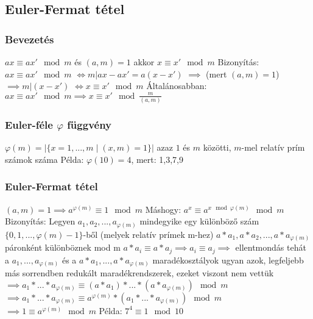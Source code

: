 \documentclass[12pt,a4paper]{article}
\begin{document}
\pagebreak

\subsection{Euler-Fermat tétel}

\subsubsection{Bevezetés}

\begin{outline}
	\1 $ax \equiv ax' \mod m$ és $(a,m)=1$ akkor $x \equiv x' \mod m$
		\2 Bizonyítás: $ax \equiv ax' \mod m$
		\2 $\Leftrightarrow m | ax-ax'=a(x-x')$
		\2 $\implies$ (mert $(a,m)=1$) $\implies m|(x-x')$
		\2 $\Leftrightarrow x \equiv x' \mod m$
	\1 Általánosabban: $ax \equiv ax' \mod m \implies x \equiv x' \mod \frac{m}{(a,m)}$
\end{outline}

\subsubsection{Euler-féle $\varphi$ függvény}

\begin{outline}
	\1 $\varphi(m)=|\{x=1,...,m \;|\; (x,m)=1\}|$
		\2 azaz $1$ és $m$ közötti, $m$-mel relatív prím számok száma
	\1 Példa: $\varphi(10)=4$, mert: 1,3,7,9
\end{outline}

\subsubsection{Euler-Fermat tétel}

\begin{outline}
	\1 $(a,m)=1 \implies a^{\varphi(m)} \equiv 1 \mod m$
		\2 Máshogy: $a^x \equiv a^{x \mod \varphi(m)} \mod m$
	\1 Bizonyítás:
		\2 Legyen $a_1, a_2, ..., a_{\varphi(m)}$ mindegyike egy különböző szám\\
		$\{0,1,...,\varphi(m)-1\}$-ből (melyek relatív prímek m-hez)
		\2 $a*a_1, a*a_2, ..., a*a_{\varphi(m)}$ páronként különböznek mod m
			\3 $a*a_i \equiv a*a_j \implies a_i \equiv a_j \implies$ ellentmondás
		\2 tehát a $a_1,...,a_{\varphi(m)}$ és a $a*a_1,...,a*a_{\varphi(m)}$ maradékosztályok
		ugyan azok, legfeljebb más sorrendben
			\3 redukált maradékrendszerek, ezeket viszont nem vettük
		\2 $\implies a_1*...*a_{\varphi(m)} \equiv (a*a_1)*...*(a*a_{\varphi(m)}) \mod m$
		\2 $\implies a_1*...*a_{\varphi(m)} \equiv a^{\varphi(m)} * (a_1*...*a_{\varphi(m)}) \mod m$
		\2 $\implies 1 \equiv a^{\varphi(m)} \mod m$
	\1 Példa: $7^4 \equiv 1 \mod 10$
\end{outline}
\end{document}
